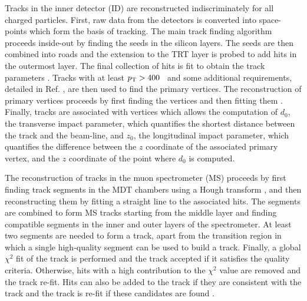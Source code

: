 Tracks in the inner detector (ID) are reconstructed indiscriminately for
all charged particles. First, raw data from the detectors is converted
into space-points which form the basis of tracking. The main track finding
algorithm proceeds inside-out by finding the seeds in the silicon layers.
The seeds are then combined into roads and the extension to the TRT layer
is probed to add hits in the outermost layer. The final collection of hits
is fit to obtain the track parameters \cite{ATLAS-CONF-2010-072, Cornelissen:1020106}.
Tracks with at least $p_{\text{T}} > 400$ \MeV~and some additional requirements, detailed
in Ref. \cite{ATL-PHYS-PUB-2015-026}, are then used to find the primary
vertices. The reconstruction of primary vertices proceeds by first finding
the vertices and then fitting them \cite{Aaboud:2016rmg}. Finally, tracks
are associated with vertices which allows the computation of $d_0$, the
transverse impact parameter, which quantifies the shortest distance
between the track and the beam-line, and $z_0$, the longitudinal impact
parameter, which quantifies the difference between the $z$ coordinate
of the associated primary vertex, and the $z$ coordinate of the point
where $d_0$ is computed.

The reconstruction of tracks in the muon spectrometer (MS) proceeds by
first finding track segments in the MDT chambers using a Hough transform
\cite{ILLINGWORTH198887}, and then reconstructing them by fitting a
straight line to the associated hits. The segments are combined to
form MS tracks starting from the middle layer and finding compatible
segments in the inner and outer layers of the spectrometer. At least two
segments are needed to form a track, apart from the transition region
in which a single high-quality segment can be used to build a track.
Finally, a global $\chi^2$ fit of the track is performed and the track
accepted if it satisfies the quality criteria. Otherwise, hits with 
a high contribution to the $\chi^2$ value are removed and the track re-fit.
Hits can also be added to the track if they are consistent with the
track and the track is re-fit if these candidates are found \cite{Aad:2016jkr}.

